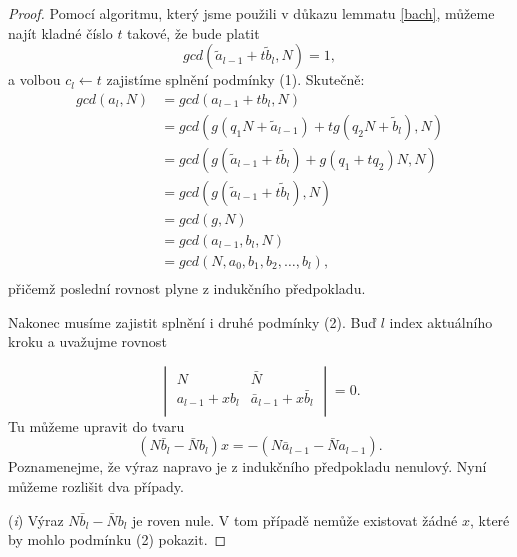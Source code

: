 \begin{proof}
Pomocí algoritmu, který jsme použili v důkazu lemmatu \ref{bach}, můžeme najít
kladné číslo $ t $ takové, že bude platit
\begin{equation}\label{t_search}
    gcd(\tilde{a}_{l-1} + t \tilde{b}_{l}, N) = 1,
\end{equation}
a volbou $ c_l \leftarrow t $ zajistíme splnění podmínky (1). Skutečně:
\begin{align*}
    gcd(a_l, N) &= gcd(a_{l-1} + t b_l, N)  \\
                &= gcd(g (q_1 N +  \tilde{a}_{l-1})
                        + tg(q_2 N + \tilde{b}_{l}), N) \\
                &= gcd(g (\tilde{a}_{l-1} + t \tilde{b}_{l})
                        + g (q_1 + t q_2) N, N) \\
                &= gcd(g (\tilde{a}_{l-1} + t \tilde{b}_{l}), N) \\
                &= gcd(g, N) \\
                &= gcd(a_{l-1}, b_l, N) \\
                &= gcd(N, a_0, b_1, b_2, \dots, b_l), \\
\end{align*}
přičemž poslední rovnost plyne z indukčního předpokladu.

Nakonec musíme zajistit splnění i druhé podmínky (2). Buď $ l $ index aktuálního
kroku a uvažujme rovnost

\begin{equation}\label{det}
    \begin{vmatrix}
        N & \bar{N} \\
        a_{l-1} + x b_l & \bar{a}_{l-1} + x \bar{b}_l  \\
    \end{vmatrix}
    = 0.
\end{equation}
Tu můžeme upravit do tvaru
\begin{equation}
    (N \bar{b}_l - \bar{N} b_l) x = -(N \bar{a}_{l-1} - \bar{N} a_{l-1}).
\end{equation}
Poznamenejme, že výraz napravo je z indukčního předpokladu nenulový. Nyní můžeme
rozlišit dva případy.

    (\textit{i}) Výraz $ N \bar{b}_l - \bar{N} b_l $ je roven nule. V tom
případě nemůže existovat žádné $ x $, které by mohlo podmínku (2) pokazit.


\end{proof}
